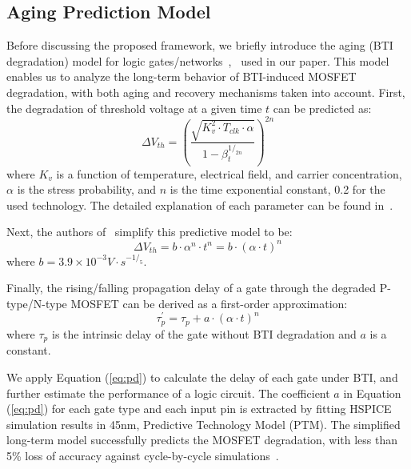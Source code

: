\subsection{Aging Prediction Model}
\label{subsec:apm}
Before discussing the proposed framework, we briefly introduce the aging (BTI degradation) model for logic gates/networks~\cite{wang2010impact},~\cite{wang2007efficient} used in our paper. This model enables us to analyze the long-term behavior of BTI-induced MOSFET degradation, with both aging and recovery mechanisms taken into account. First, the degradation of threshold voltage at a given time $t$ can be predicted as:
\begin{equation}
\label{eq:dtv}
\Delta V_{th}=\left(\frac{\sqrt{K_v^2 \cdot T_{clk} \cdot \alpha}}{1-\beta_t^{1/_{2n}}}\right)^{2n}
\end{equation}
where $K_v$ is a function of temperature, electrical field, and carrier concentration, $\alpha$ is the stress probability, and $n$ is the time exponential constant, 0.2 for the used technology. The detailed explanation of each parameter can be found in~\cite{wang2010impact}.

Next, the authors of~\cite{wang2007efficient} simplify this predictive model to be:
\begin{equation}
\label{eq:dtv2}
\Delta V_{th}=b\cdot  \alpha^n \cdot t^n = b \cdot \left(\alpha \cdot t \right)^n
\end{equation}
where $b = 3.9 \times 10^{-3} V \cdot s^{-1/_5}$.

Finally, the rising/falling propagation delay of a gate through the degraded P-type/N-type MOSFET can be derived as a first-order approximation:
\begin{equation}
\label{eq:pd}
\tau_p^\prime = \tau_p + a \cdot \left(\alpha \cdot  t\right)^n
\end{equation}
where $\tau_p$ is the intrinsic delay of the gate without BTI degradation and $a$ is a constant.

We apply Equation (\ref{eq:pd}) to calculate the delay of each gate under BTI, and further estimate the performance of a logic circuit. The coefficient $a$ in Equation (\ref{eq:pd}) for each gate type and each input pin is extracted by fitting HSPICE simulation results in 45nm, Predictive Technology Model (PTM). The simplified long-term model successfully predicts the MOSFET degradation, with less than 5\% loss of accuracy against cycle-by-cycle simulations~\cite{wang2010impact}.

